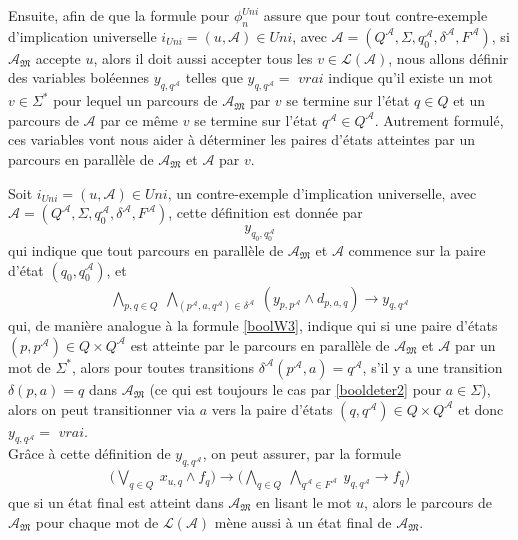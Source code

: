 \documentclass[12pt,a4paper,oneside,titlepage]{report}
\begin{document}
\noindent Ensuite, afin de que la formule pour $\phi_n^{Uni}$ assure que pour tout contre-exemple d'implication universelle $i_{Uni}=(u,\mathcal{A}) \in Uni$, avec $\mathcal{A}=(Q^\mathcal{A},\Sigma,q_0^\mathcal{A},\delta^\mathcal{A},F^\mathcal{A})$, si $\mathcal{A}_\mathfrak{M}$ accepte $u$, alors il doit aussi accepter tous les $v\in\mathcal{L}(\mathcal{A})$, nous allons définir des variables boléennes $y_{q,q^\mathcal{A}}$ telles que $y_{q,q^\mathcal{A}}=$ $vrai$ indique qu'il existe un mot $v\in\Sigma^*$ pour lequel un parcours de $\mathcal{A}_\mathfrak{M}$ par $v$ se termine sur l'état $q\in Q$ et un parcours de $\mathcal{A}$ par ce même $v$ se termine sur l'état $q^\mathcal{A}\in Q^\mathcal{A}$. Autrement formulé, ces variables vont nous aider à déterminer les paires d'états atteintes par un parcours en parallèle de $\mathcal{A}_\mathfrak{M}$ et $\mathcal{A}$ par $v$. 

\noindent Soit $i_{Uni}=(u,\mathcal{A}) \in Uni$, un contre-exemple d'implication universelle, avec $\mathcal{A}=(Q^\mathcal{A},\Sigma,q_0^\mathcal{A},\delta^\mathcal{A},F^\mathcal{A})$, cette définition est donnée par
\begin{equation}
\label{booluni1}
y_{q_0,q_0^\mathcal{A}}
\end{equation}
qui indique que tout parcours en parallèle de $\mathcal{A}_\mathfrak{M}$ et $\mathcal{A}$ commence sur la paire d'état $(q_0,q_0^\mathcal{A})$, et 
\begin{equation}
\label{booluni2}
\begin{aligned}
\bigwedge_{p,q\in Q}~ \bigwedge_{(p^\mathcal{A},a,q^\mathcal{A})\in\delta^\mathcal{A}}~ (y_{p,p^\mathcal{A}}\land d_{p,a,q})\rightarrow y_{q,q^\mathcal{A}}
\end{aligned}
\end{equation}
qui, de manière analogue à la formule \ref{boolW3}, indique qui si une paire d'états $(p,p^\mathcal{A})\in Q\times Q^\mathcal{A}$ est atteinte par le parcours en parallèle de $\mathcal{A}_\mathfrak{M}$ et $\mathcal{A}$ par un mot de $\Sigma^*$, alors pour toutes transitions $\delta^\mathcal{A}(p^\mathcal{A},a)=q^\mathcal{A}$, s'il y a une transition $\delta(p,a)=q$ dans $\mathcal{A}_\mathfrak{M}$ (ce qui est toujours le cas par \ref{booldeter2} pour $a\in\Sigma$), alors on peut transitionner via $a$ vers la paire d'états $(q,q^\mathcal{A})\in Q\times Q^\mathcal{A}$ et donc $y_{q,q^\mathcal{A}}=$ $vrai$.\\

\noindent Grâce à cette définition de $y_{q,q^\mathcal{A}}$, on peut assurer, par la formule 
\begin{equation}
\label{booluni3}
\begin{aligned} \bigl ( \bigvee _{q \in Q}~ x_{u, q} \wedge f_q \bigr ) \rightarrow \bigl ( \bigwedge _{q \in Q}~ \bigwedge _{q^\mathcal{A} \in F^\mathcal A}~ y_{q, q^\mathcal{A}} \rightarrow f_q \bigr ) \end{aligned}
\end{equation}
que si un état final est atteint dans $\mathcal{A}_\mathfrak{M}$ en lisant le mot $u$, alors le parcours de $\mathcal{A}_\mathfrak{M}$ pour chaque mot de $\mathcal{L}(\mathcal{A})$ mène aussi à un état final de $\mathcal{A}_\mathfrak{M}$.\\
\end{document}
